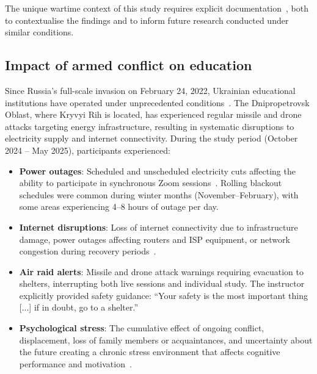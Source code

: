 The unique wartime context of this study requires explicit documentation~\cite{UNESCO2023, Martynets202428}, both to contextualise the findings and to inform future research conducted under similar conditions.

\subsection{Impact of armed conflict on education}

Since Russia's full-scale invasion on February 24, 2022, Ukrainian educational institutions have operated under unprecedented conditions~\cite{Zamkova2023299, Vovchasta2024}. The Dnipropetrovsk Oblast, where Kryvyi Rih is located, has experienced regular missile and drone attacks targeting energy infrastructure, resulting in systematic disruptions to electricity supply and internet connectivity. During the study period (October 2024 -- May 2025), participants experienced:

\begin{itemize}
\item \textbf{Power outages}: Scheduled and unscheduled electricity cuts affecting the ability to participate in synchronous Zoom sessions~\cite{Martynets202428, Zamkova2023299}. Rolling blackout schedules were common during winter months (November--February), with some areas experiencing 4--8 hours of outage per day.
\item \textbf{Internet disruptions}: Loss of internet connectivity due to infrastructure damage, power outages affecting routers and ISP equipment, or network congestion during recovery periods~\cite{Vovchasta2024}.
\item \textbf{Air raid alerts}: Missile and drone attack warnings requiring evacuation to shelters, interrupting both live sessions and individual study. The instructor explicitly provided safety guidance: ``Your safety is the most important thing [...] if in doubt, go to a shelter.''
\item \textbf{Psychological stress}: The cumulative effect of ongoing conflict, displacement, loss of family members or acquaintances, and uncertainty about the future creating a chronic stress environment that affects cognitive performance and motivation~\cite{UNESCO2023, Zamkova2023299}.
\end{itemize}

